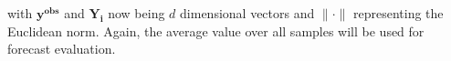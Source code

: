 \documentclass[12pt,letterpaper,fleqn]{article}           %
\begin{document}
with $\mathbf{y^{obs}}$ and $\mathbf{Y_i}$ now being $d$ dimensional vectors and $\| \cdot \|$ representing the Euclidean norm. Again, the average value over all samples will be used for forecast evaluation.




\end{document}
